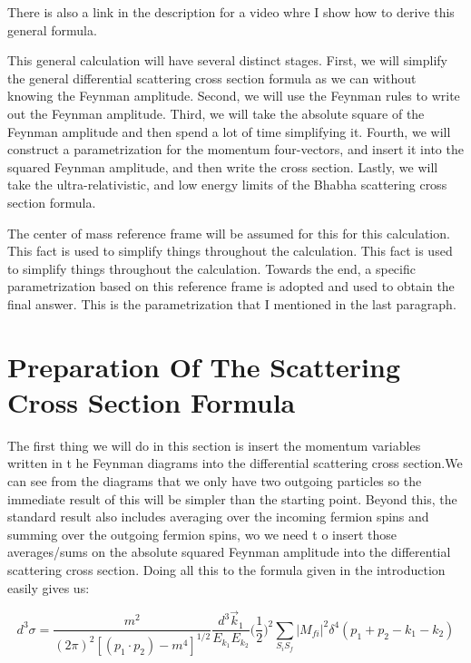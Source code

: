 \documentclass[a4]{article}
\begin{document}
    There is also a link in the description for a video whre I show how to derive this general formula.

    This general calculation will have several distinct stages. First, we will simplify the general differential scattering cross section formula as we can without knowing the Feynman amplitude.
    Second, we will use the Feynman rules to write out the Feynman amplitude. Third, we will take the absolute square of the Feynman amplitude and then spend a lot of time simplifying it. Fourth,
    we will construct a parametrization for the momentum four-vectors, and insert it into the squared Feynman amplitude, and then write the cross section. Lastly, we will take the ultra-relativistic,
    and low energy limits of the Bhabha scattering cross section formula.

    The center of mass reference frame will be assumed for this for this calculation. This fact is used to simplify things throughout the calculation. This fact is used to simplify things throughout
    the calculation. Towards the end, a specific parametrization based on this reference frame is adopted and used to obtain the final answer. This is the parametrization that I mentioned in the last
    paragraph.

    \section*{Preparation Of The Scattering Cross Section Formula}

    The first thing we will do in this section is insert the momentum variables written in t he Feynman diagrams into the differential scattering cross section.We can see from the diagrams that we only
    have two outgoing particles so the immediate result of this will be simpler than the starting point. Beyond this, the standard result also includes averaging over the incoming fermion spins and
    summing over the outgoing fermion spins, wo we need t o insert those averages/sums on the absolute squared Feynman amplitude into the differential scattering cross section. Doing all this to the
    formula given in the introduction easily gives us:

    \begin{equation}
        d^3 \sigma = \frac{m^2}{(2 \pi)^2 [(p_1 \cdot p_2) - m^4]^{1/2}} \frac{d^3 \vec{k}_1}{E_{k_1} E_{k_2}} \bigg( \frac{1}{2} \bigg)^2 \sum_{S_i S_f} |M_{fi}|^2 \delta^4 (p_1 + p_2 - k_1 - k_2)
    \end{equation}
\end{document}

